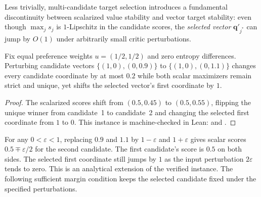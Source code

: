 Less trivially, multi-candidate target selection introduces a fundamental
discontinuity between scalarized value stability and vector target stability:
even though $\max_j s_j$ is $1$-Lipschitz in the candidate scores, the
\emph{selected vector} $\mathbf{q}'_{j^*}$ can jump by $O(1)$ under
arbitrarily small critic perturbations.

\begin{proposition}
\label{prop:reselection}
Fix equal preference weights $u = (1/2, 1/2)$ and zero entropy differences.
Perturbing candidate vectors $\{(1, 0), (0, 0.9)\}$ to $\{(1, 0), (0, 1.1)\}$
changes every candidate coordinate by at most $0.2$ while both scalar
maximizers remain strict and unique, yet shifts the selected vector's first
coordinate by $1$.
\end{proposition}
\begin{proof}
The scalarized scores shift from $(0.5, 0.45)$ to $(0.5, 0.55)$, flipping the
unique winner from candidate~1 to candidate~2 and changing the selected first
coordinate from $1$ to $0$. This instance is machine-checked in Lean:
 and .
\end{proof}

For any $0<\varepsilon<1$, replacing $0.9$ and $1.1$ by $1-\varepsilon$
and $1+\varepsilon$ gives scalar scores $0.5 \mp \varepsilon/2$ for the
second candidate. The first candidate's score is $0.5$ on both sides.
The selected first coordinate still jumps by $1$ as the input perturbation
$2\varepsilon$ tends to zero. This is an analytical extension of the verified
instance. The following sufficient margin condition keeps the selected
candidate fixed under the specified perturbations.

